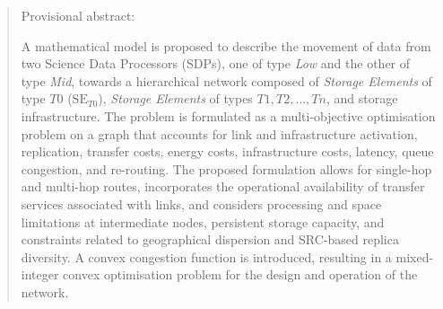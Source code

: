 \documentclass[a4paper,fleqn]{cas-dc}
\begin{document}

\author[1]{Julián Garrido}
\fnmark[3]

\author[2]{Sónia Gouveia}
\fnmark[4]










\begin{abstract}
Provisional abstract:

A mathematical model is proposed to describe the movement of data from two Science Data Processors (SDPs), one of type \emph{Low} and the other of type \emph{Mid}, towards a hierarchical network composed of \emph{Storage Elements} of type \(T0\) (\(\mathrm{SE}_{T0}\)), \emph{Storage Elements} of types \(T1, T2, \dots, Tn\), and storage infrastructure. The problem is formulated as a multi-objective optimisation problem on a graph that accounts for link and infrastructure activation, replication, transfer costs, energy costs, infrastructure costs, latency, queue congestion, and re-routing. The proposed formulation allows for single-hop and multi-hop routes, incorporates the operational availability of transfer services associated with links, and considers processing and space limitations at intermediate nodes, persistent storage capacity, and constraints related to geographical dispersion and SRC-based replica diversity. A convex congestion function is introduced, resulting in a mixed-integer convex optimisation problem for the design and operation of the network.

\end{abstract}
\end{document}
